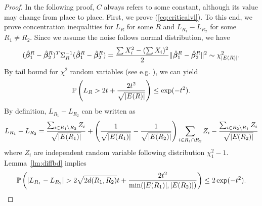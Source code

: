 \begin{proof}
In the following proof, $C$ always refers to some constant, although its value may change from place to place. First, we prove (\ref{eq:criticalvl}). To this end, we prove concentration inequalities for $L_R$ for some $R$ and $L_{R_1}-L_{R_2}$ for some $R_1\ne R_2$.
Since we assume the noise follows normal distribution, we have 
$$
(\hat{\bm{\beta}}_1^R-\hat{\bm{\beta}}_2^R)^T\Sigma_R^{-1}(\hat{\bm{\beta}}_1^R-\hat{\bm{\beta}}_2^R)={\sum X_i^2-(\sum X_i)^2\over 2}\|\hat{\bm{\beta}}_1^R-\hat{\bm{\beta}}_2^R\|^2\sim \chi^2_{|E(R)|}.
$$
By tail bound for $\chi^2$ random variables (see e.g. \cite{laurent2000adaptive}), we can yield
\begin{equation}
\label{eq:single}
\mathbb{P}\left(L_R>2t+{2t^2\over \sqrt{|E(R)|}}\right)\le \exp(-t^2).
\end{equation}
By definition, $L_{R_1}-L_{R_2}$ can be written as
$$
L_{R_1}-L_{R_2}={\sum_{i\in R_1\setminus R_2}Z_i\over \sqrt{|E(R_1)|}}+ \left({1 \over \sqrt{|E(R_1)|}}-{1 \over \sqrt{|E(R_2)|}}\right)\sum_{i\in R_1\cap R_2}Z_i -{\sum_{i\in R_2\setminus R_1}Z_i\over \sqrt{|E(R_2)|}}
$$
where $Z_i$ are independent random variable following distribution $\chi_1^2-1$.
Lemma~\ref{lm:diffbd} implies
\begin{equation}
\label{eq:diff}
\PP\left(|L_{R_1}-L_{R_2}|>2\sqrt{2d(R_1,R_2)}t+{2t^2\over \min(|E(R_1)|,|E(R_2)|)}\right)\le 2\exp(-t^2).
\end{equation}


\end{proof}
